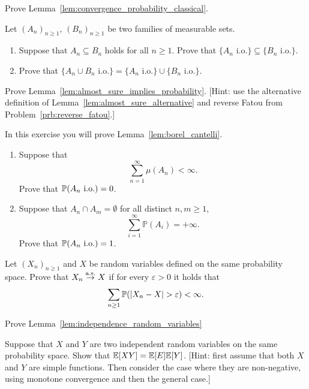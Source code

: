 \begin{problem}\label{prb:convergence_probability_classic}
Prove Lemma~\ref{lem:convergence_probability_classical}.
\end{problem}

\begin{problem}\label{prb:properties_io}
Let $(A_n)_{n \ge 1}$, $(B_n)_{n \ge 1}$ be two families of measurable sets. 
\begin{enumerate}[label={(\alph*)}]
\item Suppose that $A_n \subseteq B_n$ holds for all $n \ge 1$. Prove that $\{A_n \text{ i.o.}\} \subseteq \{B_n \text{ i.o.}\}$.
\item Prove that $\{A_n \cup B_n \text{ i.o.}\} = \{A_n \text{ i.o.}\} \cup \{B_n \text{ i.o.}\}$.
\end{enumerate}
\end{problem}

\begin{problem}\label{prb:almost_sure_implies_probability}
Prove Lemma~\ref{lem:almost_sure_implies_probability}. [Hint: use the alternative definition of Lemma~\ref{lem:almost_sure_alternative} and reverse Fatou from Problem~\ref{prb:reverse_fatou}.]
\end{problem}

\begin{problem}\label{prb:borel_cantelli}
In this exercise you will prove Lemma~\ref{lem:borel_cantelli}.

\begin{enumerate}[label={(\alph*)}]
\item Suppose that
\[
	\sum_{n=1}^\infty \mu(A_n) < \infty.
\]
Prove that $\mathbb P(A_n \text{ i.o.}) = 0$.
\item Suppose that $A_n \cap A_m = \emptyset$ for all distinct $n,m \ge 1$,
\[
	\sum_{i=1}^\infty \mathbb{P}(A_i) = +\infty.
\]
Prove that $\mathbb P(A_n \text{ i.o.}) = 1$.
\end{enumerate}
\end{problem}

\begin{problem}
Let $(X_n)_{n \ge 1}$ and $X$ be random variables defined on the same probability space. Prove that $X_n \stackrel{\mathrm{a.s.}}{\rightarrow} X$ if for every $\varepsilon > 0$ it holds that
\[
	\sum_{n \ge 1} \mathbb P(|X_n - X| > \varepsilon) < \infty.
\]
\end{problem}

\begin{problem}\label{prb:independence_random_variables}
Prove Lemma~\ref{lem:independence_random_variables}
\end{problem}

\begin{problem}\label{prb:expectation_independent_product}
Suppose that $X$ and $Y$ are two independent random variables on the same probability space. Show that $\mathbb E[XY] = \mathbb E[E]\mathbb E[Y]$.
[Hint: first assume that both $X$ and $Y$ are simple functions. Then consider the case where they are non-negative, using monotone convergence and then the general case.]


\end{problem}
